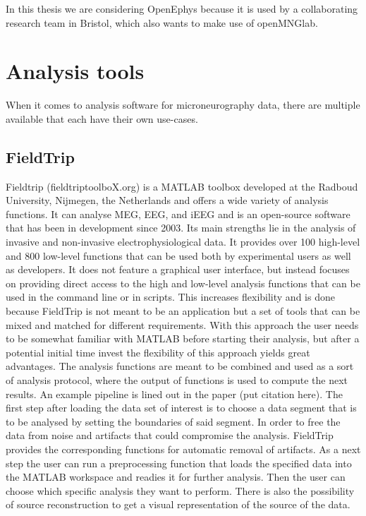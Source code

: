 In this thesis we are considering OpenEphys because it is used by a collaborating research team in Bristol, which also wants to make use of openMNGlab.


\section{Analysis tools}
When it comes to analysis software for microneurography data,  there are multiple available that each have their own use-cases.

\subsection{FieldTrip}
Fieldtrip (fieldtriptoolboX.org) is a MATLAB toolbox developed at the Radboud University,  Nijmegen,  the Netherlands and offers a wide variety of analysis functions.  It can analyse MEG, EEG, and iEEG and is an open-source software that has been in development since 2003. Its main strengths lie in the analysis of invasive and non-invasive electrophysiological data. It provides over 100 high-level and 800 low-level functions that can be used both by experimental users as well as developers. It does not feature a graphical user interface, but instead focuses on providing direct access to the high and low-level analysis functions that can be used in the command line or in scripts.  This increases flexibility and is done because FieldTrip is not meant to be an application but a set of tools that can be mixed and matched for different requirements.
With this approach the user needs to be somewhat familiar with MATLAB before starting their analysis, but after a potential initial time invest the flexibility of this approach yields great advantages.
The analysis functions are meant to be combined and used as a sort of analysis protocol, where the output of functions is used to compute the next results. 
An example pipeline is lined out in the paper (put citation here). The first step after loading the data set of interest is to choose a data segment that is to be analysed by setting the boundaries of said segment. In order to free the data from noise and artifacts that could compromise the analysis. FieldTrip provides the corresponding functions for automatic removal of artifacts. As a next step the user can run a preprocessing function that loads the specified data into the MATLAB workspace and readies it for further analysis. Then the user can choose which specific analysis they want to perform. There is also the possibility of source reconstruction to get a visual representation of the source of the data.\\
